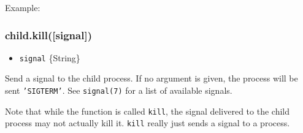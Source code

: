 Example:

\begin{Shaded}
\begin{Highlighting}[]
 \NormalTok{,}
    \NormalTok{, [}\NormalTok{]);}

\NormalTok{(} \NormalTok{+ }\NormalTok{);}
\NormalTok{();}
\end{Highlighting}
\end{Shaded}

\subsubsection{child.kill({[}signal{]})}

\begin{itemize}
\item
  \texttt{signal} \{String\}
\end{itemize}

Send a signal to the child process. If no argument is given, the process
will be sent \texttt{'SIGTERM'}. See \texttt{signal(7)} for a list of
available signals.

\begin{Shaded}
\begin{Highlighting}[]
 \NormalTok{,}
    \NormalTok{, [}\NormalTok{]);}

\NormalTok{(}\NormalTok{, } 
  \NormalTok{(}
\NormalTok{\});}

\NormalTok{(}\NormalTok{);}
\end{Highlighting}
\end{Shaded}

Note that while the function is called \texttt{kill}, the signal
delivered to the child process may not actually kill it. \texttt{kill}
really just sends a signal to a process.


